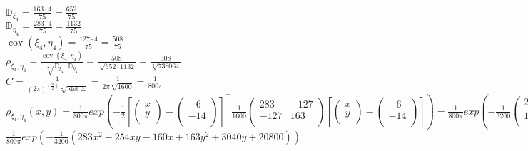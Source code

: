 \documentclass{article}
\begin{document}
$\mathbb{D}_{\xi_4}=\frac{163\cdot4}{75}=\frac{652}{75}$\\

$\mathbb{D}_{\eta_4}=\frac{283\cdot4}{75}=\frac{1132}{75}$\\

$\mathop{\mathrm{cov}}\nolimits(\xi_{4}, \eta_{4})=\frac{127\cdot4}{75}=\frac{508}{75}$\\

$\rho_{\xi_{4},\eta_{4}}=\frac{\mathop{\mathrm{cov}}\nolimits(\xi_{4}, \eta_{4})}{\sqrt[•]{\mathbb{D}_{\xi_{4}}\cdot\mathbb{D}_{\eta_{4}}}}=\frac{508}{\sqrt[]{652\cdot1132}}=\frac{508}{\sqrt[•]{738064}}$\\

$C=\frac{1}{(2\pi)^{\left(\frac{n}{2}\right)}\sqrt[•]{\det\Sigma}}=\frac{1}{2\pi\sqrt[•]{1600}}=\frac{1}{800\pi}$\\

$\rho_{\xi_{4},\eta_{4}}(x,y)=\frac{1}{800\pi}exp\left(
-\frac{1}{2}
\left[
  	\left(
  		{\begin{array}{c}
    			x\\
    			y\\
  		\end{array}}
  	\right)
-
  	\left(
  		{\begin{array}{c}
    			-6\\
    			-14\\
  		\end{array}}
  	\right)
\right]^\top
\frac{1}{1600}
\left(
	{\begin{array}{cc}
  		283 & -127\\
  		-127 & 163\\
	\end{array}}
\right)
\left[
 	 \left(
  		{\begin{array}{c}
    			x\\
    			y\\
  		\end{array}}
  	\right)
-
  	\left(
  		{\begin{array}{c}
    			-6\\
    			-14\\
  		\end{array}}
  	\right)
\right]
\right)
=
\frac{1}{800\pi}exp\left(
-\frac{1}{3200}
  	\left(
  		{\begin{array}{c}
    			283x-127y+1698-1778\\
    			163y-127x+2282-762\\
  		\end{array}}
  	\right)^\top
  	\left(
  		{\begin{array}{c}
    			x+6\\
    			y+14\\
  		\end{array}}
  	\right)
\right)
=$\\
$\frac{1}{800\pi}exp\left(-\frac{1}{3200}(283x^2-254xy-160x+163y^2+3040y+20800)\right)$\\
\end{document}
